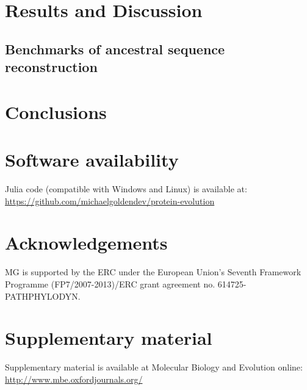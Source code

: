 \documentclass[nogrid]{MBE}%
\begin{document}
\section{Results and Discussion}

\subsection{Benchmarks of ancestral sequence reconstruction}
	
\section{Conclusions}

\section{Software availability}
Julia code (compatible with Windows and Linux) is available at: \href{https://github.com/michaelgoldendev/protein-evolution}{https://github.com/michaelgoldendev/protein-evolution}

\section{Acknowledgements}
MG is supported by the ERC under the European Union’s Seventh Framework Programme (FP7/2007-2013)/ERC grant agreement no. 614725-PATHPHYLODYN. 

\ifmbeformat
\section{Supplementary material}
Supplementary material is available  at Molecular Biology and Evolution
online: \url{http://www.mbe.oxfordjournals.org/}
\fi

\end{document}

